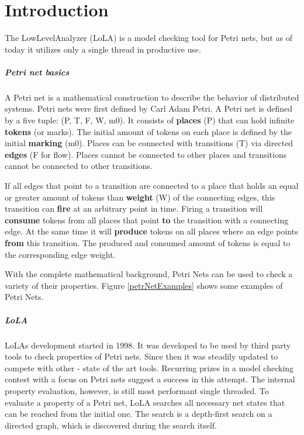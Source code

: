 \chapter{Introduction}
\label{introduction}

The LowLevelAnalyzer (LoLA) is a model checking tool for Petri nets, but as of today it utilizes only a single thread in productive use.

\paragraph*{Petri net basics}
A Petri net is a mathematical construction to describe the behavior of distributed systems. Petri nets were first defined by Carl Adam Petri\cite{Petri1962kommunikation}. A Petri net is defined by a five tuple: (P, T, F, W, m0). It consists of \textbf{places} (P) that can hold infinite \textbf{tokens} (or marks). The initial amount of tokens on each place is defined by the initial \textbf{marking} (m0). Places can be connected with transitions (T) via directed \textbf{edges} (F for flow). Places cannot be connected to other places and transitions cannot be connected to other transitions.

If all edges that point to a transition are connected to a place that holds an equal or greater amount of tokens than \textbf{weight} (W) of the connecting edges, this transition can \textbf{fire} at an arbitrary point in time. Firing a transition will \textbf{consume} tokens from all places that point \textbf{to} the transition with a connecting edge. At the same time it will \textbf{produce} tokens on all places where an edge points \textbf{from} this transition. The produced and consumed amount of tokens is equal to the corresponding edge weight.

With the complete mathematical background, Petri Nets can be used to check a variety of their properties. Figure \ref{petrNetExamples} shows some examples of Petri Nets.



\paragraph*{LoLA}
LoLAs development started in 1998. It was developed to be used by third party tools to check properties of Petri nets\cite{schmidt2000lola}. Since then it was steadily updated to compete with other - state of the art tools. Recurring prizes in a model checking contest with a focus on Petri nets suggest a success in this attempt\cite{MCC2017}.
The internal property evaluation, however, is still most performant single threaded. To evaluate a property of a Petri net, LoLA searches all necessary net states that can be reached from the initial one. The search is a depth-first search on a directed graph, which is discovered during the search itself.


